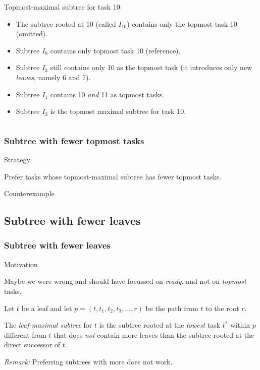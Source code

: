 \documentclass{beamer}
\newenvironment{strategyblock}
{
  \begin{block}{Strategy}
}
{
  \end{block}
}
\newenvironment{motivationblock}
{
  \begin{block}{Motivation}
}
{
  \end{block}
}
\newenvironment{counterexampleblock}
{
  \begin{alertblock}{Counterexample}
}
{
  \end{alertblock}
}
\newcommand{\todo}[1]{ {\color{red}{#1} }}
\begin{document}
\begin{frame}
\begin{columns}
\begin{column}{.7\textwidth}
      Topmost-maximal subtree for task 10:
      \begin{itemize}
      \item<2-> The subtree rooted at 10 (called $I_{10}$) contains only the topmost task 10 (omitted). %
      \item<3-> Subtree $I_8$ contains only topmost task 10 (reference).
      \item<4-> Subtree $I_3$ still contains only 10 as the topmost task (it introduces only new \emph{leaves}, namely 6 and 7).
      \item<5-> Subtree $I_1$ contains 10 \emph{and} 11 as topmost tasks.
      \item<6-> Subtree $I_3$ is the topmost maximal subtree for task 10.
      \end{itemize}
    \end{column}
  \end{columns}
\end{frame}


\begin{frame}
  \frametitle{Subtree with fewer topmost tasks}
  \begin{strategyblock}
    Prefer tasks whose topmost-maximal subtree has fewer topmost tasks.
  \end{strategyblock}
  \begin{counterexampleblock}
    \todo{Bild!}
  \end{counterexampleblock}
\end{frame}

\subsection{Subtree with fewer leaves}

\begin{frame}
  \frametitle{Subtree with fewer leaves}
  \begin{motivationblock}
    Maybe we were wrong and should have focussed on \emph{ready}, and not on \emph{topmost} tasks.
  \end{motivationblock}
  \begin{definition}
    Let $t$ be a leaf and let $p=(t, t_1, t_2, t_3, \dots, r)$ be the path from $t$ to the root $r$.

    The \emph{leaf-maximal subtree} for $t$ is the subtree rooted at the \emph{lowest} task $t^*$ within $p$ different from $t$ that does \emph{not} contain more leaves than the subtree rooted at the direct successor of $t$. 
  \end{definition}
  \emph{Remark:} Preferring subtrees with more does not work.
\end{frame}
\end{document}
